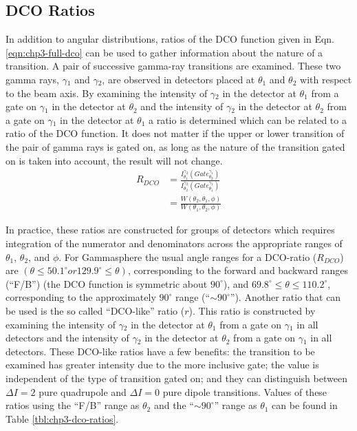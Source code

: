 \subsection{DCO Ratios}
\label{sssec:exp-pr-data-ang-cor-dco}
In addition to angular distributions, ratios of the DCO function given in Eqn. \ref{eqn:chp3-full-dco} can be used to gather information about the nature of a transition\cite{dcoRatios}. A pair of successive gamma-ray transitions are examined. These two gamma rays, $\gamma{}_1$ and $\gamma{}_2$, are observed in detectors placed at $\theta{}_1$ and $\theta{}_2$ with respect to the beam axis. By examining the intensity of $\gamma{}_2$ in the detector at $\theta_1$ from a gate on $\gamma{}_1$ in the detector at $\theta{}_2$ and the intensity of $\gamma{}_2$ in the detector at $\theta_2$ from a gate on $\gamma{}_1$ in the detector at $\theta{}_1$ a ratio is determined which can be related to a ratio of the DCO function. It does not matter if the upper or lower transition of the pair of gamma rays is gated on, as long as the nature of the transition gated on is taken into account, the result will not change.
\begin{align}
R_{DCO} &= \frac{I^{\gamma{}_2}_{\theta{}_1}(Gate^{\gamma{}_1}_{\theta{}_2})}{I^{\gamma{}_2}_{\theta{}_2}(Gate^{\gamma{}_1}_{\theta{}_1})} \label{eqn:chp3:exp-dco-ratio}\\
 &= \frac{W(\theta{}_2,\theta{}_1,\phi{})}{W(\theta{}_1,\theta{}_2,\phi{})} \label{eqn:chp3:theory-dco-ratio}
\end{align}

In practice, these ratios are constructed for groups of detectors which requires integration of the numerator and denominators across the appropriate ranges of $\theta{}_1$, $\theta{}_2$, and $\phi{}$. For Gammasphere the usual angle ranges for a DCO-ratio ($R_{DCO}$) are $(\theta{}\leq{}50.1^{\circ} or 129.9^{\circ}\leq{}\theta{})$, corresponding to the forward and backward ranges (``F/B'') (the DCO function is symmetric about $90^{\circ}$), and $69.8^{\circ}\leq{}\theta{}\leq{}110.2^{\circ}$, corresponding to the approximately $90^{\circ{}}$ range (``$\sim{}90^{\circ}$'').  Another ratio that can be used is the so called ``DCO-like'' ratio ($r$). This ratio is constructed by examining the intensity of $\gamma{}_2$ in the detector at $\theta_1$ from a gate on $\gamma{}_1$ in all detectors and the intensity of $\gamma{}_2$ in the detector at $\theta_2$ from a gate on $\gamma{}_1$ in all detectors. These DCO-like ratios have a few benefits: the transition to be examined has greater intensity due to the more inclusive gate; the value is independent of the type of transition gated on; and they can distinguish between $\Delta I=2$ pure quadrupole and $\Delta I=0$ pure dipole transitions. Values of these ratios using the ``F/B'' range as $\theta_2$ and the ``$\sim{}90^{\circ}$'' range as $\theta_1$ can be found in Table \ref{tbl:chp3-dco-ratios}.

